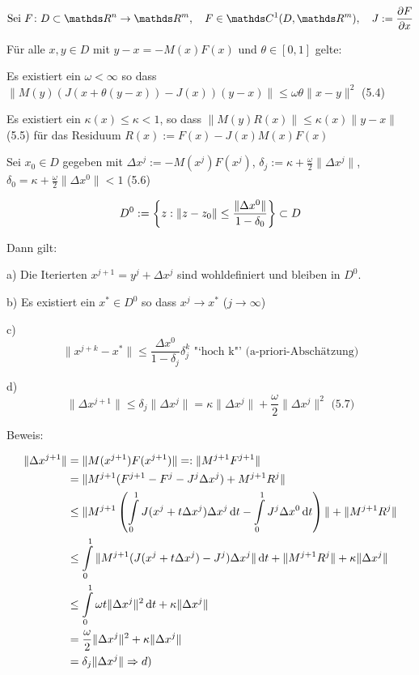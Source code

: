 
\[ \text{Sei } F\colon D \subset \R^n \to \R^m, \quad F \in \C^1(D,\R^m), \quad J := \frac{\partial F}{\partial x} \]

Für alle $x,y \in D$ mit $y-x = -M(x) F(x)$ und $\theta \in [0,1]$ gelte:

\bitm
\item Es existiert ein $\omega < \infty$ so dass $\| M(y) (J(x+\theta(y-x)) - J(x)) (y-x) \| \leq \omega \theta \|x-y\|^2$ (5.4)
\item Es existiert ein $\kappa(x) \leq \kappa < 1$, so dass $\| M(y) R(x) \| \leq \kappa(x) \|y-x\|$ (5.5) für das Residuum $R(x) := F(x) - J(x)M(x)F(x)$
\item Sei $x_0 \in D$ gegeben mit $\Delta x^j := -M(x^j) F(x^j)$, $\delta_j := \kappa + \frac \omega 2 \| \Delta x^j \|$, $\delta_0 = \kappa + \frac \omega 2 \|\Delta x^0 \| < 1$ (5.6)
\item \[ D^0 := \left\{ z : \|z-z_0\| \leq \frac{\|\Delta x^0\|}{1-\delta_0} \right\} \subset D \]
\eitm

Dann gilt:

\bitm
\item a) Die Iterierten $x^{j+1} = y^j + \Delta x^j$ sind wohldefiniert und bleiben in $D^0$.
\item b) Es existiert ein $x^* \in D^0$ so dass $x^j \to x^*$ ($j \to \infty$)
\item c) \[ \| x^{j+k} - x^*\| \leq \frac{\Delta x^0}{1-\delta_j} \delta_j^k \text{ "`hoch k"' (a-priori-Abschätzung)} \]
\item d) \[ \| \Delta x^{j+1} \| \leq \delta_j \| \Delta x^j \| = \kappa \| \Delta x^j \| + \frac \omega 2 \| \Delta x^j\|^2 \text{ (5.7)} \]
\eitm

Beweis:

\begin{align*}
\| \Delta x^{j+1} \| &= \| M(x^{j+1}) F(x^{j+1}) \| =: \| M^{j+1} F^{j+1} \| \\
&= \| M^{j+1} (F^{j+1} - F^j - J^j \Delta x^j) + M^{j+1} R^j \| \\
& \leq \| M^{j+1} \left( \int\limits_0^1 J(x^j + t \Delta x^j) \Delta x^j \,\mathrm d t - \int\limits_0^1 J^j \Delta x^0 \,\mathrm d t \right)\| + \|M^{j+1} R^j \| \\
&\leq \int\limits_0^1 \| M^{j+1} (J(x^j + t \Delta x^j) - J^j) \Delta x^j \| \,\mathrm d t + \|M^{j+1} R^j \| + \kappa \| \Delta x^j \| \\
&\leq \int\limits_0^1 \omega t \| \Delta x^j \|^2 \,\mathrm d t + \kappa \|\Delta x^j \| \\
&= \frac \omega 2 \|\Delta x^j\|^2 + \kappa \| \Delta x^j \| \\
&= \delta_j \| \Delta x^j \| \Rightarrow d) \\
\end{align*}

